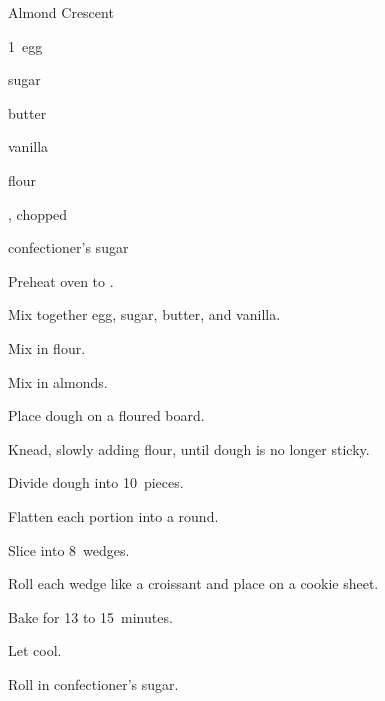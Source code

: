 \begin{recipe}{Almond Crescent}{}{}

\begin{ingredients}
\item 1~egg
\item \C{\twothird} sugar
\item {} butter
\item {} vanilla
\item {} flour
\item {} , chopped
\item confectioner's sugar
\end{ingredients}

\begin{directions}
\item Preheat oven to .
\item Mix together egg, sugar, butter, and vanilla.
\item Mix in flour.
\item Mix in almonds.
\item Place dough on a floured board.
\item Knead, slowly adding flour, until dough is no longer sticky.
\item Divide dough into 10~pieces.
\item Flatten each portion into a round.
\item Slice into 8~wedges.
\item Roll each wedge like a croissant and place on a cookie sheet.
\item Bake for 13 to 15~minutes.
\item Let cool.
\item Roll in confectioner's sugar.
\end{directions}

\end{recipe}

